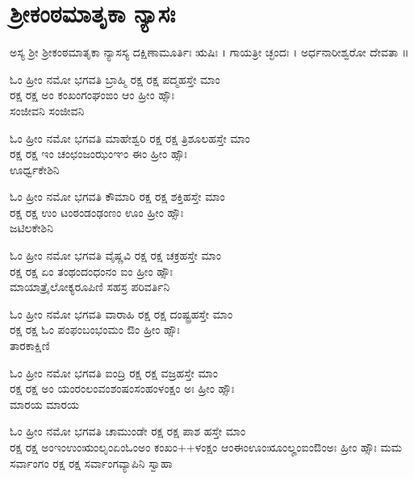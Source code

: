 \section{ಶ್ರೀಕಂಠಮಾತೃಕಾ ನ್ಯಾಸಃ}
ಅಸ್ಯ ಶ್ರೀ ಶ್ರೀಕಂಠಮಾತೃಕಾ ನ್ಯಾಸಸ್ಯ ದಕ್ಷಿಣಾಮೂರ್ತಿಃ ಋಷಿಃ । ಗಾಯತ್ರೀ ಚ್ಛಂದಃ । ಅರ್ಧನಾರೀಶ್ವರೋ ದೇವತಾ ॥

ಓಂ ಹ್ರೀಂ ನಮೋ ಭಗವತಿ ಬ್ರಾಹ್ಮಿ ರಕ್ಷ ರಕ್ಷ ಪದ್ಮಹಸ್ತೇ ಮಾಂ\\ ರಕ್ಷ ರಕ್ಷ  ಅಂ ಕಂಖಂಗಂಘಂಙಂ ಆಂ ಹ್ರೀಂ ಹ್ಸೌಃ \\ಸಂಜೀವನಿ ಸಂಜೀವನಿ  

ಓಂ ಹ್ರೀಂ ನಮೋ ಭಗವತಿ ಮಾಹೇಶ್ವರಿ ರಕ್ಷ ರಕ್ಷ ತ್ರಿಶೂಲಹಸ್ತೇ ಮಾಂ \\ರಕ್ಷ ರಕ್ಷ ಇಂ ಚಂಛಂಜಂಝಂಞಂ ಈಂ  ಹ್ರೀಂ ಹ್ಸೌಃ\\ ಊರ್ಧ್ವಕೇಶಿನಿ 

ಓಂ ಹ್ರೀಂ ನಮೋ ಭಗವತಿ ಕೌಮಾರಿ ರಕ್ಷ ರಕ್ಷ ಶಕ್ತಿಹಸ್ತೇ ಮಾಂ\\ ರಕ್ಷ ರಕ್ಷ ಉಂ ಟಂಠಂಡಂಢಂಣಂ ಊಂ  ಹ್ರೀಂ ಹ್ಸೌಃ\\ ಜಟಿಲಕೇಶಿನಿ 

ಓಂ ಹ್ರೀಂ ನಮೋ ಭಗವತಿ ವೈಷ್ಣವಿ ರಕ್ಷ ರಕ್ಷ ಚಕ್ರಹಸ್ತೇ ಮಾಂ\\ ರಕ್ಷ ರಕ್ಷ ಏಂ ತಂಥಂದಂಧಂನಂ ಐಂ ಹ್ರೀಂ ಹ್ಸೌಃ\\ ಮಾಯಾತ್ರೈಲೋಕ್ಯರೂಪಿಣಿ ಸಹಸ್ರ ಪರಿವರ್ತಿನಿ 

ಓಂ ಹ್ರೀಂ ನಮೋ ಭಗವತಿ ವಾರಾಹಿ ರಕ್ಷ ರಕ್ಷ ದಂಷ್ಟ್ರಹಸ್ತೇ ಮಾಂ\\ ರಕ್ಷ ರಕ್ಷ ಓಂ ಪಂಫಂಬಂಭಂಮಂ ಔಂ ಹ್ರೀಂ ಹ್ಸೌಃ\\ ತಾರಕಾಕ್ಷಿಣಿ 

ಓಂ ಹ್ರೀಂ ನಮೋ ಭಗವತಿ ಐಂದ್ರಿ ರಕ್ಷ ರಕ್ಷ ವಜ್ರಹಸ್ತೇ ಮಾಂ\\ ರಕ್ಷ ರಕ್ಷ ಅಂ ಯಂರಂಲಂವಂಶಂಷಂಸಂಹಂಳಂಕ್ಷಂ ಅಃ  ಹ್ರೀಂ ಹ್ಸೌಃ \\ಮಾರಯ ಮಾರಯ 

ಓಂ ಹ್ರೀಂ ನಮೋ ಭಗವತಿ ಚಾಮುಂಡೇ ರಕ್ಷ ರಕ್ಷ ಪಾಶ ಹಸ್ತೇ ಮಾಂ\\ ರಕ್ಷ ರಕ್ಷ  ಅಂಇಂಉಂಋಂಲೃಂಏಂಓಂಅಂ ಕಂಖಂ++ಳಂಕ್ಷಂ ಆಂಈಂಊಂೠಂಲೄಂಐಂಔಂಅಃ  ಹ್ರೀಂ ಹ್ಸೌಃ ಮಮ ಸರ್ವಾಂಗಂ ರಕ್ಷ ರಕ್ಷ ಸರ್ವಾಂಗವ್ಯಾಪಿನಿ ಸ್ವಾಹಾ 


